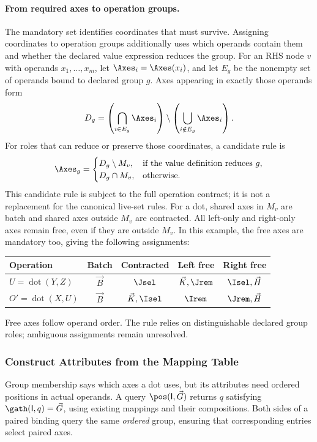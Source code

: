 \paragraph{From required axes to operation groups.}
The mandatory set identifies coordinates that must survive. Assigning coordinates to
operation groups additionally uses which operands contain them and whether
the declared value expression reduces the group. For an RHS node $v$ with
operands $x_1,\ldots,x_m$, let $\Axes_i=\Axes(x_i)$, and let $E_g$ be the
nonempty set of operands bound to declared group $g$. Axes appearing in exactly
those operands form
\begin{equation}
 D_g=\left(\bigcap_{i\in E_g}\Axes_i\right)
     \setminus\left(\bigcup_{i\notin E_g}\Axes_i\right).
\end{equation}
For roles that can reduce or preserve those coordinates, a candidate rule is
\begin{equation}
 \Axes_g=\begin{cases}
 D_g\setminus M_v,&\text{if the value definition reduces }g,\\
 D_g\cap M_v,&\text{otherwise.}
 \end{cases}
 \label{extended:eq:group-assignment}
\end{equation}
This candidate rule is subject to the full operation contract; it is not a
replacement for the canonical live-set rules. For a dot, shared axes in $M_v$
are batch and shared axes outside $M_v$ are contracted. All left-only and
right-only axes remain free, even if they are outside $M_v$. In this example,
the free axes are mandatory too, giving the following assignments:
\begin{center}
\begin{tabular}{@{}lcccc@{}}\toprule
Operation & Batch & Contracted & Left free & Right free\\\midrule
$U=\operatorname{dot}(Y,Z)$ & $\vec B$ & $\Jsel$ & $\vec K,\Jrem$ & $\Isel,\vec H$\\
$O'=\operatorname{dot}(X,U)$ & $\vec B$ & $\vec K,\Isel$ & $\Irem$ & $\Jrem,\vec H$\\\bottomrule
\end{tabular}
\end{center}
Free axes follow operand order. The rule relies on distinguishable declared
group roles; ambiguous assignments remain unresolved.


\subsubsection{Construct Attributes from the Mapping Table}
\label{extended:sec:attribute-construction}
Group membership says which axes a dot uses, but its attributes need ordered
positions in actual operands. A query $\pos(\mathsf{I},\vec G)$ returns $q$ satisfying
$\gath(\mathsf{I},q)=\vec G$, using existing mappings and their compositions. Both sides
of a paired binding query the same \emph{ordered} group, ensuring that
corresponding entries select paired axes.


